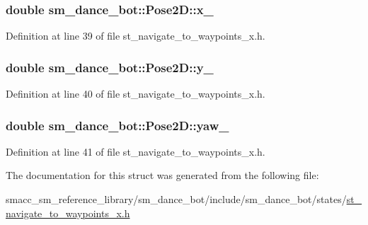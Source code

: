 \subsubsection[{\texorpdfstring{x\+\_\+}{x_}}]{\setlength{\rightskip}{0pt plus 5cm}double sm\+\_\+dance\+\_\+bot\+::\+Pose2\+D\+::x\+\_\+}\hypertarget{structsm__dance__bot_1_1Pose2D_a3430dc7f2d3c63774b6ba228cb92ace8}{}\label{structsm__dance__bot_1_1Pose2D_a3430dc7f2d3c63774b6ba228cb92ace8}


Definition at line 39 of file st\+\_\+navigate\+\_\+to\+\_\+waypoints\+\_\+x.\+h.

\subsubsection[{\texorpdfstring{y\+\_\+}{y_}}]{\setlength{\rightskip}{0pt plus 5cm}double sm\+\_\+dance\+\_\+bot\+::\+Pose2\+D\+::y\+\_\+}\hypertarget{structsm__dance__bot_1_1Pose2D_a208d60512a4132516a35e9a9dbf58819}{}\label{structsm__dance__bot_1_1Pose2D_a208d60512a4132516a35e9a9dbf58819}


Definition at line 40 of file st\+\_\+navigate\+\_\+to\+\_\+waypoints\+\_\+x.\+h.

\subsubsection[{\texorpdfstring{yaw\+\_\+}{yaw_}}]{\setlength{\rightskip}{0pt plus 5cm}double sm\+\_\+dance\+\_\+bot\+::\+Pose2\+D\+::yaw\+\_\+}\hypertarget{structsm__dance__bot_1_1Pose2D_aa1e24c51b613e1c5043ca3848c9a8ec9}{}\label{structsm__dance__bot_1_1Pose2D_aa1e24c51b613e1c5043ca3848c9a8ec9}


Definition at line 41 of file st\+\_\+navigate\+\_\+to\+\_\+waypoints\+\_\+x.\+h.



The documentation for this struct was generated from the following file\+:\begin{DoxyCompactItemize}
\item 
smacc\+\_\+sm\+\_\+reference\+\_\+library/sm\+\_\+dance\+\_\+bot/include/sm\+\_\+dance\+\_\+bot/states/\hyperlink{st__navigate__to__waypoints__x_8h}{st\+\_\+navigate\+\_\+to\+\_\+waypoints\+\_\+x.\+h}\end{DoxyCompactItemize}
